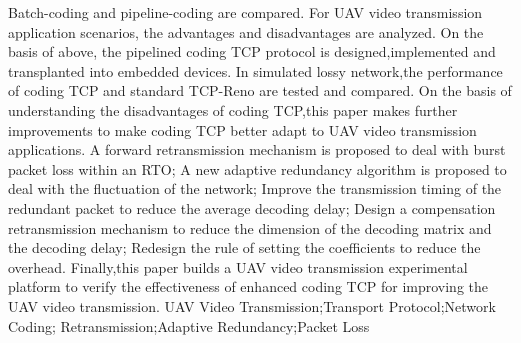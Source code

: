 {	Batch-coding and pipeline-coding are compared.
	For UAV video transmission application scenarios, the advantages and disadvantages are analyzed.
	On the basis of above, the pipelined coding TCP protocol is designed,implemented and transplanted into embedded devices.
	In simulated lossy network,the performance of coding TCP and standard TCP-Reno are tested and compared.
	On the basis of understanding the disadvantages of coding TCP,this paper makes further improvements to make coding TCP better adapt to UAV video transmission applications.
	A forward retransmission mechanism is proposed to deal with burst packet loss within an RTO;
	A new adaptive redundancy algorithm is proposed to deal with the fluctuation of the network;
	Improve the transmission timing of the redundant packet to reduce the average decoding delay;
	Design a compensation retransmission mechanism to reduce the dimension of the decoding matrix and the decoding delay;
	Redesign the rule of setting the coefficients to reduce the overhead.
	Finally,this paper builds a UAV video transmission experimental platform to verify the effectiveness of enhanced coding TCP for improving the UAV video transmission.
}
{UAV Video Transmission;Transport Protocol;Network Coding; Retransmission;Adaptive Redundancy;Packet Loss}	%